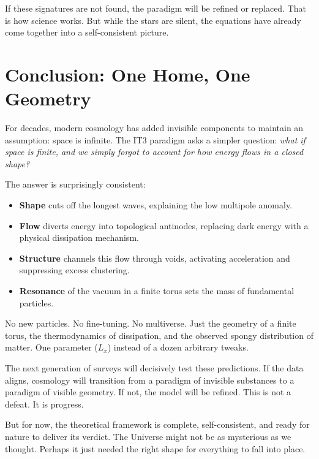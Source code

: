 \documentclass[12pt,a4paper,oneside]{book}
\begin{document}
If these signatures are not found, the paradigm will be refined or replaced. That is how science works. But while the stars are silent, the equations have already come together into a self-consistent picture.

\backmatter

\chapter*{Conclusion: One Home, One Geometry}

For decades, modern cosmology has added invisible components to maintain an assumption: space is infinite. The IT3 paradigm asks a simpler question: \emph{what if space is finite, and we simply forgot to account for how energy flows in a closed shape?}

The answer is surprisingly consistent:
\begin{itemize}
    \item \textbf{Shape} cuts off the longest waves, explaining the low multipole anomaly.
    \item \textbf{Flow} diverts energy into topological antinodes, replacing dark energy with a physical dissipation mechanism.
    \item \textbf{Structure} channels this flow through voids, activating acceleration and suppressing excess clustering.
    \item \textbf{Resonance} of the vacuum in a finite torus sets the mass of fundamental particles.
\end{itemize}

No new particles. No fine-tuning. No multiverse. Just the geometry of a finite torus, the thermodynamics of dissipation, and the observed spongy distribution of matter. One parameter ($L_x$) instead of a dozen arbitrary tweaks.

The next generation of surveys will decisively test these predictions. If the data aligns, cosmology will transition from a paradigm of invisible substances to a paradigm of visible geometry. If not, the model will be refined. This is not a defeat. It is progress.

But for now, the theoretical framework is complete, self-consistent, and ready for nature to deliver its verdict. The Universe might not be as mysterious as we thought. Perhaps it just needed the right shape for everything to fall into place.
\end{document}

